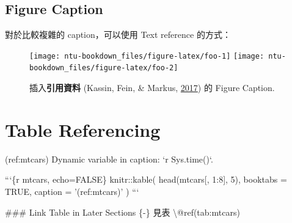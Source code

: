 \documentclass[oneside]{book}
\newenvironment{Shaded}{\begin{snugshade}}{\end{snugshade}}
\newcommand{\BaseNTok}[1]{\textcolor[rgb]{0.00,0.00,0.81}{#1}}
\newcommand{\FunctionTok}[1]{\textcolor[rgb]{0.00,0.00,0.00}{#1}}
\newcommand{\NormalTok}[1]{#1}
\theoremstyle{definition}
\theoremstyle{definition}
\theoremstyle{definition}
\theoremstyle{remark}
\begin{document}
\subsection{Figure Caption}\label{figure-caption}

對於比較複雜的 caption，可以使用 Text reference 的方式：

\begin{Shaded}
\end{Shaded}




\begin{figure}[H]

{\centering \texttt{[image: ntu-bookdown\_files/figure-latex/foo-1]} \texttt{[image: ntu-bookdown\_files/figure-latex/foo-2]} 

}

\caption{插入\textbf{引用資料} (Kassin, Fein, \& Markus,
\protect\hyperlink{ref-kassin2017}{2017}) 的 Figure Caption.}\label{fig:foo}
\end{figure}

\section{Table Referencing}\label{table-referencing}

\begin{Shaded}
\begin{Highlighting}[]
\NormalTok{(ref:mtcars) Dynamic variable in caption: }\BaseNTok{`r Sys.time()`}\NormalTok{.}

\NormalTok{```\{r mtcars, echo=FALSE\}}
\NormalTok{knitr::kable(}
\NormalTok{  head(mtcars[, 1:8], 5), booktabs = TRUE,}
\NormalTok{  caption = '(ref:mtcars)'}
\NormalTok{  )}
\NormalTok{```}

\FunctionTok{### Link Table in Later Sections \{-\}}
\NormalTok{見表 \textbackslash{}@ref(tab:mtcars)}
\end{Highlighting}
\end{Shaded}
\end{document}
